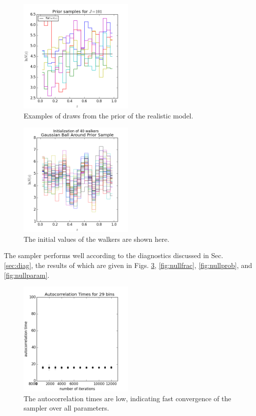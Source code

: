 \documentclass[preprint]{aastex}
\begin{document}
\begin{figure}
\includegraphics[width=0.5\textwidth]{null/priorsamps.png}
\caption{Examples of draws from the prior of the realistic model.}
\label{fig:nullprior}
\end{figure}

\begin{figure}
\includegraphics[width=0.5\textwidth]{null/initializations.png}
\caption{The initial values of the walkers are shown here.}
\label{fig:nullival}
\end{figure}

The sampler performs well according to the diagnostics discussed in Sec. \ref{sec:diag}, the results of which are given in Figs. \ref{fig:nullacor}, \ref{fig:nullfrac}, \ref{fig:nullprob}, and \ref{fig:nullparam}.  

\begin{figure}
\includegraphics[width=0.5\textwidth]{times-real.png}
\caption{The autocorrelation times are low, indicating fast convergence of the sampler over all parameters.}
\label{fig:nullacor}
\end{figure}
\end{document}

